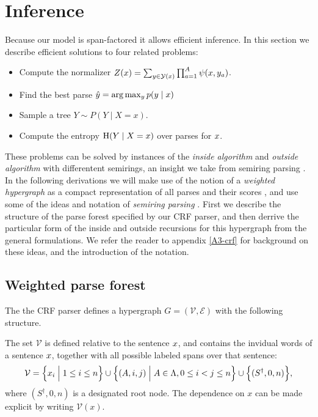 \section{Inference}
  \label{sect:inference}
  Because our model is span-factored it allows efficient inference. In this section we describe efficient solutions to four related problems:
  \begin{itemize}
    \item Compute the normalizer $Z(x) = \sum_{ y \in \mathcal{Y}(x) } \prod_{ a=1 }^{ A } \psi( x, y_a )$.
    \item Find the best parse $\hat{ y } = \arg \max_{y } p(y  \mid x)$
    \item Sample a tree $Y \sim P(Y \mid X = x)$.
    \item Compute the entropy $\operatorname{H}(Y \mid X = x)$ over parses for $x$.
  \end{itemize}
  These problems can be solved by instances of the \textit{inside algorithm} and \textit{outside algorithm} \citep{baker1979trainable} with differentent semirings, an insight we take from semiring parsing \citep{goodman1999semiring}. In the following derivations we will make use of the notion of a \textit{weighted hypergraph} as a compact representation of all parses and their scores \citep{gallo1993directed,klein2004parsing}, and use some of the ideas and notation of \textit{semiring parsing} \citep{goodman1999semiring,eisner2009semirings}. First we describe the structure of the parse forest specified by our CRF parser, and then derrive the particular form of the inside and outside recursions for this hypergraph from the general formulations. We refer the reader to appendix \ref{A3-crf} for background on these ideas, and the introduction of the notation.

  \subsection{Weighted parse forest}
    The the CRF parser defines a hypergraph $G = (\mathcal{V}, \mathcal{E})$ with the following structure.

    The set $\mathcal{V}$ is defined relative to the sentence $x$, and contains the invidual words of a sentence $x$, together with all possible labeled spans over that sentence:
    \begin{align*}
      \mathcal{V} = \Big\{ x_i \; \Big\vert \; 1 \leq i \leq n \Big\} \cup \Big\{ (A, i, j) \; \Big\vert \; A \in \Lambda, 0 \leq i < j \leq n \Big\} \cup \Big\{ (S^{\dagger}, 0, n) \Big\},
    \end{align*}
    where $(S^{\dagger}, 0, n)$ is a designated root node. The dependence on $x$ can be made explicit by writing $\mathcal{V}(x)$.

